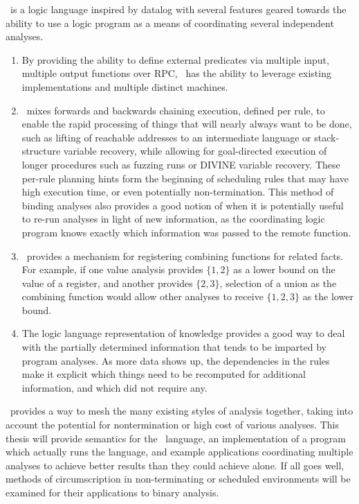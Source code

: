 \sysname\ is a logic language inspired by datalog with several features geared towards the ability to use a logic program as a means of coordinating several independent analyses.
\begin{enumerate}
\item
By providing the ability to define external predicates via multiple input, multiple output functions over RPC, \sysname\ has the ability to leverage existing implementations and multiple distinct machines.
\item
\sysname\ mixes forwards and backwards chaining execution, defined per rule, to enable the rapid processing of things that will nearly always want to be done, such as lifting of reachable addresses to an intermediate language or stack-structure variable recovery, while allowing for goal-directed execution of longer procedures such as fuzzing runs or DIVINE variable recovery.
These per-rule planning hints form the beginning of scheduling rules that may have high execution time, or even potentially non-termination.
This method of binding analyses also provides a good notion of when it is potentially useful to re-run analyses in light of new information, as the coordinating logic program knows exactly which information was passed to the remote function.
\item
\sysname\ provides a mechanism for registering combining functions for related facts.
For example, if one value analysis provides $\{1, 2\}$ as a lower bound on the value of a register, and another provides $\{2, 3\}$, selection of a union as the combining function would allow other analyses to receive $\{1, 2, 3\}$ as the lower bound.
\item
The logic language representation of knowledge provides a good way to deal with the partially determined information that tends to be imparted by program analyses. As more data shows up, the dependencies in the rules make it explicit which things need to be recomputed for additional information, and which did not require any.
\end{enumerate}

\sysname\ provides a way to mesh the many existing styles of analysis together, taking into account the potential for nontermination or high cost of various analyses. This thesis will provide semantics for the \sysname\ language, an implementation of a program which actually runs the language, and example applications coordinating multiple analyses to achieve better results than they could achieve alone. If all goes well, methods of circumscription in non-terminating or scheduled environments will be examined for their applications to binary analysis.
